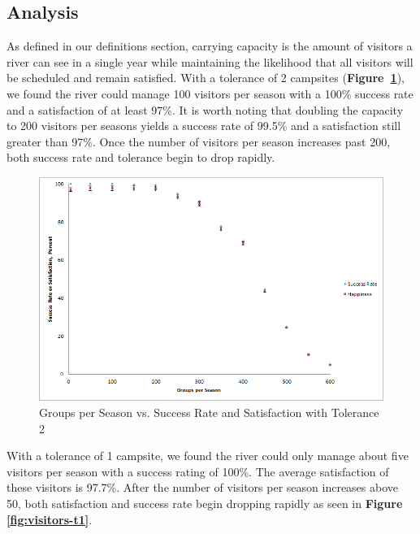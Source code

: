 \documentclass[11pt]{article} %
\begin{document}
\subsection{Analysis}
\label{sec:capacity}
As defined in our definitions section, carrying capacity is
the amount of visitors a river can see in a single
year while maintaining the likelihood that all visitors will be scheduled and
remain satisfied. With a
tolerance of 2 campsites (\textbf{Figure~\ref{fig:visitors-t2}}), we found
the river could manage 100 visitors per
season with a 100\% success rate and a satisfaction of at least 97\%.
It is worth noting that doubling the capacity to 200 visitors per
seasons yields a success rate of 99.5\% and a satisfaction still greater
than 97\%. Once the number of visitors per season increases past 200,
both success rate and tolerance begin to drop rapidly.
\begin{figure}[h]
  \centering
  \includegraphics[scale=.6]{imgs/Graph_VistorsChanges_Tolerance2.png}
  \caption{Groups per Season vs. Success Rate and Satisfaction with Tolerance 2}
  \label{fig:visitors-t2}
\end{figure}
With a tolerance of 1 campsite, we found the river could only manage about
five visitors per season with a success rating of 100\%. The average
satisfaction of these visitors is 97.7\%. After the number of visitors per
season increases above 50, both satisfaction and success rate begin dropping
rapidly as seen in \textbf{Figure \ref{fig:visitors-t1}}.
\end{document}
